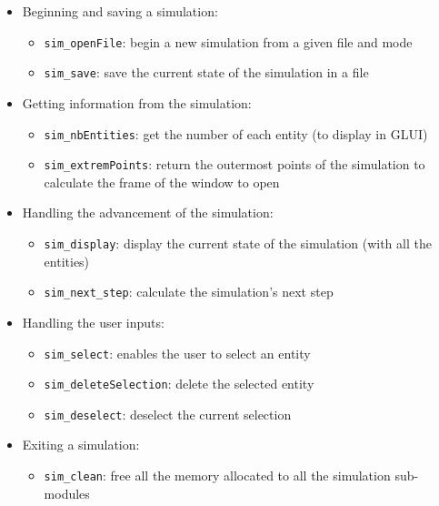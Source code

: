 \documentclass[a4paper]{article} %
\begin{document}
\begin{multicols*}{2}
\begin{itemize}
\item Beginning and saving a simulation:
    \begin{itemize}
    \item \texttt{sim\_openFile}: begin a new simulation from a given file and mode
    \item \texttt{sim\_save}: save the current state of the simulation in a file
    \end{itemize}
\item Getting information from the simulation:
    \begin{itemize}
    \item \texttt{sim\_nbEntities}: get the number of each entity (to display in GLUI)
    \item \texttt{sim\_extremPoints}: return the outermost points of the simulation to calculate the frame of the window to open
    \end{itemize}
\item Handling the advancement of the simulation:
    \begin{itemize}
    \item \texttt{sim\_display}: display the current state of the simulation (with all the entities) 
    \item \texttt{sim\_next\_step}: calculate the simulation's next step
    \end{itemize}
\item Handling the user inputs:
    \begin{itemize}
    \item \texttt{sim\_select}: enables the user to select an entity
    \item \texttt{sim\_deleteSelection}: delete the selected entity
    \item \texttt{sim\_deselect}: deselect the current selection
    \end{itemize}
\item Exiting a simulation:
    \begin{itemize}
    \item \texttt{sim\_clean}: free all the memory allocated to all the simulation sub-modules
    \end{itemize}
\end{itemize}



\label{lastpage}
\end{multicols*}
\end{document}
